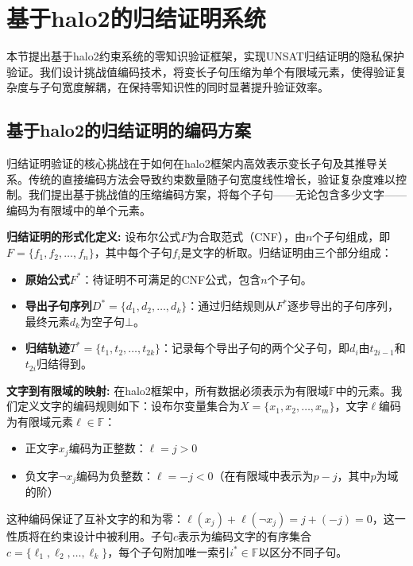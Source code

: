 \section{基于halo2的归结证明系统}\label{sec:plonkish-zk-system}

本节提出基于halo2约束系统的零知识验证框架，实现UNSAT归结证明的隐私保护验证。我们设计挑战值编码技术，将变长子句压缩为单个有限域元素，使得验证复杂度与子句宽度解耦，在保持零知识性的同时显著提升验证效率。

\subsection{基于halo2的归结证明的编码方案}\label{sec:unsat-challenge-encoding}

归结证明验证的核心挑战在于如何在halo2框架内高效表示变长子句及其推导关系。传统的直接编码方法会导致约束数量随子句宽度线性增长，验证复杂度难以控制。我们提出基于挑战值的压缩编码方案，将每个子句——无论包含多少文字——编码为有限域中的单个元素。

\textbf{归结证明的形式化定义:}
设布尔公式$F$为合取范式（CNF），由$n$个子句组成，即$F = \{f_1, f_2, \ldots, f_n\}$，其中每个子句$f_i$是文字的析取。归结证明由三个部分组成：
\begin{itemize}
    \item \textbf{原始公式}$F^*$：待证明不可满足的CNF公式，包含$n$个子句。
    \item \textbf{导出子句序列}$D^* = \{d_1, d_2, \ldots, d_k\}$：通过归结规则从$F^*$逐步导出的子句序列，最终元素$d_k$为空子句$\bot$。
    \item \textbf{归结轨迹}$T^* = \{t_1, t_2, \ldots, t_{2k}\}$：记录每个导出子句的两个父子句，即$d_i$由$t_{2i-1}$和$t_{2i}$归结得到。
\end{itemize}

\textbf{文字到有限域的映射:}
在halo2框架中，所有数据必须表示为有限域$\mathbb{F}$中的元素。我们定义文字的编码规则如下：设布尔变量集合为$X = \{x_1, x_2, \ldots, x_m\}$，文字$\ell$编码为有限域元素$\ell \in \mathbb{F}$：
\begin{itemize}
    \item 正文字$x_j$编码为正整数：$\ell = j > 0$
    \item 负文字$\neg x_j$编码为负整数：$\ell = -j < 0$（在有限域中表示为$p - j$，其中$p$为域的阶）
\end{itemize}
这种编码保证了互补文字的和为零：$\ell(x_j) + \ell(\neg x_j) = j + (-j) = 0$，这一性质将在约束设计中被利用。子句$c$表示为编码文字的有序集合$c = \{\ell_1, \ell_2, \ldots, \ell_k\}$，每个子句附加唯一索引$i^* \in \mathbb{F}$以区分不同子句。

